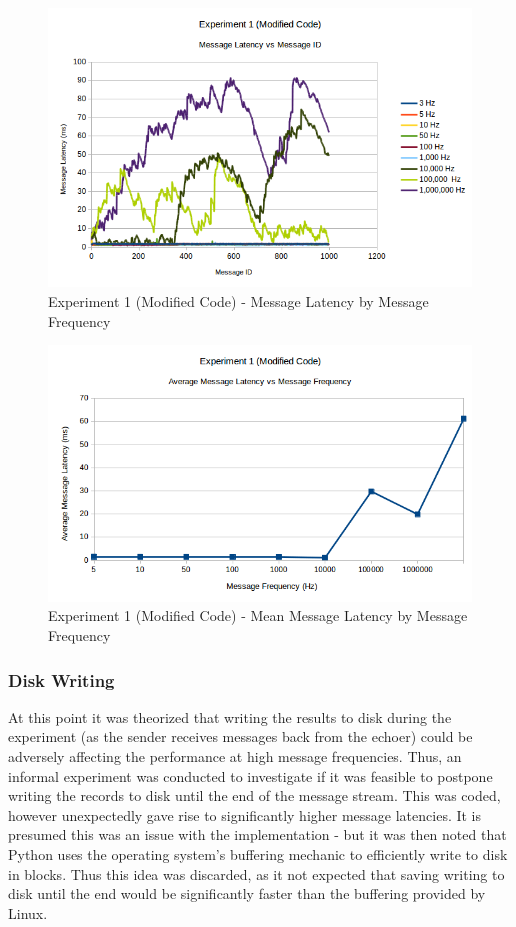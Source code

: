 \documentclass[../dissertation.tex]{subfiles}
\begin{document}
\begin{figure}[H]
\centering
\includegraphics[width=\textwidth]{images/experiment1/modified_msgid_msglatency_all_freqs.png}
\caption{Experiment 1 (Modified Code) - Message Latency by Message Frequency}
\label{exp1-modified-all-freqs}
\end{figure}

\begin{figure}[H]
\centering
\includegraphics[width=\textwidth]{images/experiment1/modified_average_msglatency_all_freqs.png}
\caption{Experiment 1 (Modified Code) - Mean Message Latency by Message Frequency}
\label{exp1-modified-mean-latency-all-freqs}
\end{figure}

\subsubsection{Disk Writing}

At this point it was theorized that writing the results to disk during the experiment (as the sender receives messages back from the echoer) could be adversely affecting the performance at high message frequencies. Thus, an informal experiment was conducted to investigate if it was feasible to postpone writing the records to disk until the end of the message stream. This was coded, however unexpectedly gave rise to significantly higher message latencies. It is presumed this was an issue with the implementation - but it was then noted that Python uses the operating system's buffering mechanic to efficiently write to disk in blocks. Thus this idea was discarded, as it not expected that saving writing to disk until the end would be significantly faster than the buffering provided by Linux.
\end{document}
